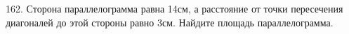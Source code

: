 162. Сторона параллелограмма равна 14см, а расстояние от точки пересечения диагоналей до этой стороны равно 3см. Найдите площадь параллелограмма.\\
